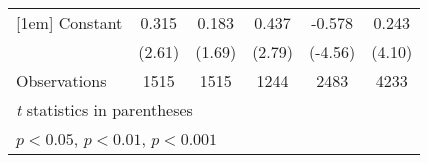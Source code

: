{\begin{tabular*}{\linewidth}{@{\hskip\tabcolsep\extracolsep\fill}l*{5}{c}}
[1em]
Constant        &    0.315\sym{*}  &    0.183         &    0.437\sym{**} &   -0.578\sym{***}&    0.243\sym{***}\\
                &   (2.61)         &   (1.69)         &   (2.79)         &  (-4.56)         &   (4.10)         \\
\hline
Observations    &     1515         &     1515         &     1244         &     2483         &     4233         \\
\hline\hline
\multicolumn{6}{l}{\footnotesize \textit{t} statistics in parentheses}\\
\multicolumn{6}{l}{\footnotesize \sym{*} \(p<0.05\), \sym{**} \(p<0.01\), \sym{***} \(p<0.001\)}\\
\end{tabular*}
}
